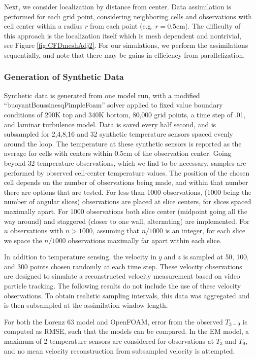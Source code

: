 \documentclass[12pt]{report}
\begin{document}
Next, we consider localization by distance from center.
Data assimilation is performed for each grid point, considering neighboring cells and observations with cell center within a radius $r$ from each point (e.g. $r = 0.5$cm).
The difficulty of this approach is the localization itself which is mesh dependent and nontrivial, see Figure \ref{fig:CFDmeshAdj2}.
For our simulations, we perform the assimilations sequentially, and note that there may be gains in efficiency from parallelization.

\subsubsection{Generation of Synthetic Data}

Synthetic data is generated from one model run, with a modified ``buoyantBoussinesqPimpleFoam'' solver applied to fixed value boundary conditions of 290K top and 340K bottom, 80,000 grid points, a time step of .01, and laminar turbulence model.
Data is saved every half second, and is subsampled for 2,4,8,16 and 32 synthetic temperature sensors spaced evenly around the loop.
The temperature at these synthetic sensors is reported as the average for cells with centers within 0.5cm of the observation center.
Going beyond 32 temperature observations, which we find to be necessary, samples are performed by observed cell-center temperature values.
The position of the chosen cell depends on the number of observations being made, and within that number there are options that are tested.
For less than 1000 observations, (1000 being the number of angular slices) observations are placed at slice centers, for slices spaced maximally apart.
For 1000 observations both slice center (midpoint going all the way around) and staggered (closer to one wall, alternating) are implemented.
For $n$ observations with $n>1000$, assuming that $n/1000$ is an integer, for each slice we space the $n/1000$ observations maximally far apart within each slice.

In addition to temperature sensing, the velocity in $y$ and $z$ is sampled at 50, 100, and 300 points chosen randomly at each time step.
These velocity observations are designed to simulate a reconstructed velocity measurement based on video particle tracking.
The following results do not include the use of these velocity observations.
To obtain realistic sampling intervals, this data was aggregated and is then subsampled at the assimilation window length.

For both the Lorenz 63 model and OpenFOAM, error from the observed $T_{3-9}$ is computed as RMSE, such that the models can be compared.
In the EM model, a maximum of 2 temperature sensors are considered for observations at $T_3$ and $T_9$, and no mean velocity reconstruction from subsampled velocity is attempted.
\end{document}
